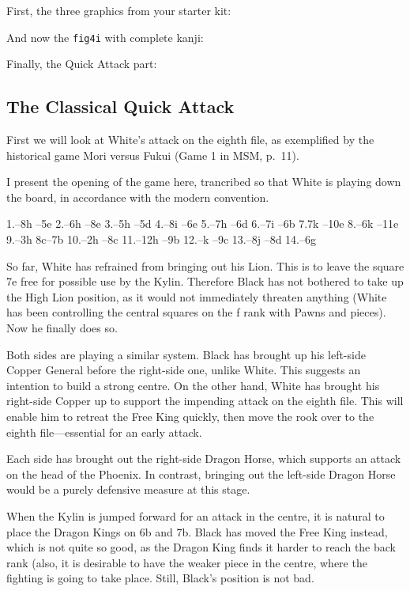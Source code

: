 \documentclass{article}
\begin{document}
First, the three graphics from your starter kit:







\bigskip
And now the \texttt{fig4i} with complete kanji:



Finally, the Quick Attack part:

\subsection*{The Classical Quick Attack}

First we will look at White's attack on the eighth file, as
   exemplified by the historical game Mori versus Fukui (Game 1 in MSM, p.~11).

I present the opening of the game here, trancribed so that White is
playing down the board, in accordance with the modern convention.

1.\Fu--8h \Fu--5e 2.\Shi--6h \Fu--8e 3.\Fu--5h \Ho--5d 4.\Ho--8i \Fu--6e 5.\Fu--7h \Ki--6d 6.\Ki--7i \Ryu--6b 7.\Ryu7k \Fu--10e 8.\Hon--6k \Ma--11e 9.\Fu--3h \Ryu8c--7b 10.\Ma--2h \Hon--8c 11.\Fu--12h \Do--9b 12.--k \Do--9c 13.\Do--8j \Do--8d 14.\Shi--6g



So far, White has refrained from bringing out his Lion. This is to
leave the square 7e free for possible use by the Kylin. Therefore
Black has not bothered to take up the High Lion position, as it would
not immediately threaten anything (White has been controlling the
central squares on the f rank with Pawns and pieces). Now he finally
does so.

Both sides are playing a similar system. Black has brought up his
left-side Copper General before the right-side one, unlike White. This
suggests an intention to build a strong centre. On the other hand,
White has brought his right-side Copper up to support the impending
attack on the eighth file. This will enable him to retreat the Free
King quickly, then move the rook over to the eighth file---essential for an early attack.
  
Each side has brought out the right-side Dragon Horse, which supports
an attack on the head of the Phoenix. In contrast, bringing out the
left-side Dragon Horse would be a purely defensive measure at this
stage.

When the Kylin is jumped forward for an attack in the centre, it is
natural to place the Dragon Kings on 6b and 7b. Black has moved the
Free King instead, which is not quite so good, as the Dragon King
finds it harder to reach the back rank (also, it is desirable to have
the weaker piece in the centre, where the fighting is going to take
place. Still, Black's position is not bad.
\end{document}
